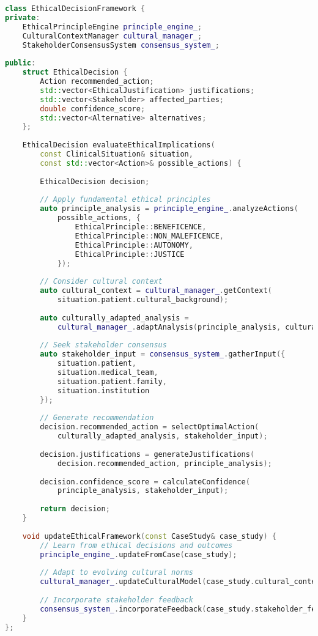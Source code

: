 \begin{lstlisting}[language=C++, caption={Ethical Decision Framework}, label={lst:ethical-framework}]
class EthicalDecisionFramework {
private:
    EthicalPrincipleEngine principle_engine_;
    CulturalContextManager cultural_manager_;
    StakeholderConsensusSystem consensus_system_;
    
public:
    struct EthicalDecision {
        Action recommended_action;
        std::vector<EthicalJustification> justifications;
        std::vector<Stakeholder> affected_parties;
        double confidence_score;
        std::vector<Alternative> alternatives;
    };
    
    EthicalDecision evaluateEthicalImplications(
        const ClinicalSituation& situation,
        const std::vector<Action>& possible_actions) {
        
        EthicalDecision decision;
        
        // Apply fundamental ethical principles
        auto principle_analysis = principle_engine_.analyzeActions(
            possible_actions, {
                EthicalPrinciple::BENEFICENCE,
                EthicalPrinciple::NON_MALEFICENCE,
                EthicalPrinciple::AUTONOMY,
                EthicalPrinciple::JUSTICE
            });
        
        // Consider cultural context
        auto cultural_context = cultural_manager_.getContext(
            situation.patient.cultural_background);
        
        auto culturally_adapted_analysis = 
            cultural_manager_.adaptAnalysis(principle_analysis, cultural_context);
        
        // Seek stakeholder consensus
        auto stakeholder_input = consensus_system_.gatherInput({
            situation.patient,
            situation.medical_team,
            situation.patient.family,
            situation.institution
        });
        
        // Generate recommendation
        decision.recommended_action = selectOptimalAction(
            culturally_adapted_analysis, stakeholder_input);
        
        decision.justifications = generateJustifications(
            decision.recommended_action, principle_analysis);
        
        decision.confidence_score = calculateConfidence(
            principle_analysis, stakeholder_input);
        
        return decision;
    }
    
    void updateEthicalFramework(const CaseStudy& case_study) {
        // Learn from ethical decisions and outcomes
        principle_engine_.updateFromCase(case_study);
        
        // Adapt to evolving cultural norms
        cultural_manager_.updateCulturalModel(case_study.cultural_context);
        
        // Incorporate stakeholder feedback
        consensus_system_.incorporateFeedback(case_study.stakeholder_feedback);
    }
};
\end{lstlisting}

